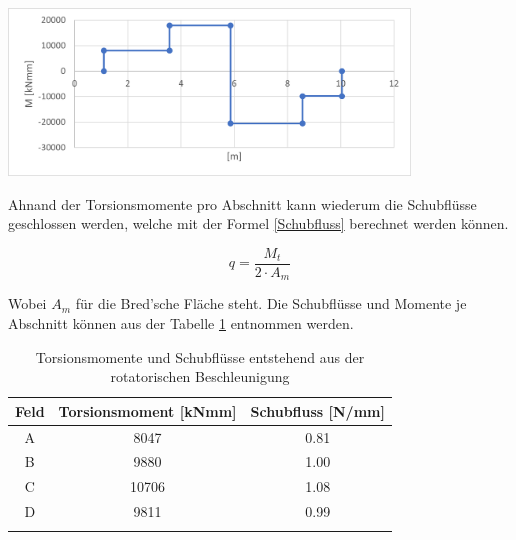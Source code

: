 \begin{center}
  \includegraphics[width=0.8\textwidth]{04_Figures/1.5 Momentenverlauf.png}
  \label{1.5 Momentenverlauf}
\end{center}

Ahnand der Torsionsmomente pro Abschnitt kann wiederum die Schubflüsse geschlossen werden, welche mit der Formel \ref{Schubfluss} berechnet werden können.

\begin{equation}
  q = \frac{M_t}{2 \cdot A_m}
  \label{Schubfluss}
\end{equation}

Wobei $A_m$ für die Bred'sche Fläche steht.
Die Schubflüsse und Momente je Abschnitt können aus der Tabelle \ref{Schubfluss resultat} entnommen werden.


\begin{table}[h!]
  \centering
  \begin{tabular}{ccc}
    \thickhline
    Feld &Torsionsmoment [kNmm] &Schubfluss [N/mm] \\ \hline
    A                        & 8047                                      & 0.81                                  \\
    B                        & 9880                                      & 1.00                                  \\
    C                        & 10706                                     & 1.08                                  \\
    D                        & 9811                                      & 0.99                                  \\
    \thickhline
  \end{tabular}
\caption{Torsionsmomente und Schubflüsse entstehend aus der rotatorischen Beschleunigung}%
\label{Schubfluss resultat}
\end{table}



















